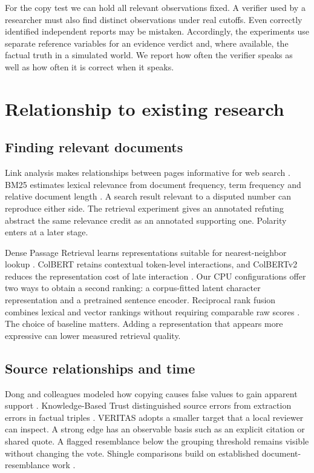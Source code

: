 For the copy test we can hold all relevant observations fixed. A verifier used by a researcher must also find distinct observations under real cutoffs. Even correctly identified independent reports may be mistaken. Accordingly, the experiments use separate reference variables for an evidence verdict and, where available, the factual truth in a simulated world. We report how often the verifier speaks as well as how often it is correct when it speaks.

\section{Relationship to existing research}
\subsection{Finding relevant documents}
Link analysis makes relationships between pages informative for web search \cite{PageRank}. BM25 estimates lexical relevance from document frequency, term frequency and relative document length \cite{BM25}. A search result relevant to a disputed number can reproduce either side. The retrieval experiment gives an annotated refuting abstract the same relevance credit as an annotated supporting one. Polarity enters at a later stage.

Dense Passage Retrieval learns representations suitable for nearest-neighbor lookup \cite{DPR}. ColBERT retains contextual token-level interactions, and ColBERTv2 reduces the representation cost of late interaction \cite{ColBERT,ColBERTv2}. Our CPU configurations offer two ways to obtain a second ranking: a corpus-fitted latent character representation and a pretrained sentence encoder. Reciprocal rank fusion combines lexical and vector rankings without requiring comparable raw scores \cite{RRF}. The choice of baseline matters. Adding a representation that appears more expressive can lower measured retrieval quality.

\subsection{Source relationships and time}
Dong and colleagues modeled how copying causes false values to gain apparent support \cite{Dependence}. Knowledge-Based Trust distinguished source errors from extraction errors in factual triples \cite{KBT}. VERITAS adopts a smaller target that a local reviewer can inspect. A strong edge has an observable basis such as an explicit citation or shared quote. A flagged resemblance below the grouping threshold remains visible without changing the vote. Shingle comparisons build on established document-resemblance work \cite{MinHash}.

